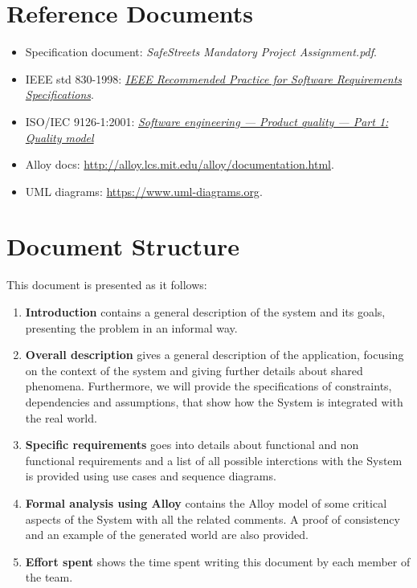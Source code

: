 \documentclass{report}
\begin{document}
\section{Reference Documents} \label{docs}
\begin{itemize}
	\item Specification document: \textit{SafeStreets Mandatory Project Assignment.pdf}.
	\item IEEE std 830-1998:  \href{http://www.math.uaa.alaska.edu/~afkjm/cs401/}{\textit{IEEE Recommended Practice for Software Requirements Specifications}}.
	\item ISO/IEC 9126-1:2001: \href{https://www.iso.org/standard/22749.html}{\textit{Software engineering — Product quality — Part 1: Quality model}}
	\item Alloy docs: \url{http://alloy.lcs.mit.edu/alloy/documentation.html}.
	\item UML diagrams: \url{https://www.uml-diagrams.org}.
\end{itemize}
\section{Document Structure}
This document is presented as it follows:
\begin{enumerate}
	\item {\textbf{Introduction}} contains a general description of the system and its goals, presenting the problem in an informal way.
	\item{\textbf{Overall description}} gives a general description of the application, focusing on the context of the system and giving further details about shared phenomena. Furthermore, we will provide the specifications of constraints, dependencies and assumptions, that show how the System is integrated with the real world.
	\item{\textbf{Specific requirements}} goes into details about functional and non functional requirements and a list of all possible interctions with the System is provided using use cases and sequence diagrams.
	\item {\textbf{Formal analysis using Alloy}} contains the Alloy model of some critical aspects of the System with all the related comments. A proof of consistency and an example of the generated world are also provided.
	\item {\textbf{Effort spent}} shows the time spent writing this document by each member of the team.
\end{enumerate}
\end{document}
